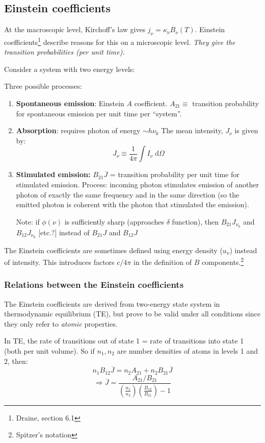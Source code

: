 \documentclass[11pt]{article}
\newcommand{\mar}[1]{\hspace{0pt}\marginpar{-\textcolor{black}{#1}-}}
\newcommand{\mynotes}[1]{{\fontfamily{cmss}\selectfont \textit{#1}}}
\begin{document}
\subsection{Einstein coefficients}
At the macroscopic level, Kirchoff's law gives $ j_{\nu} = \kappa_{\nu}
B_{\nu}(T) $. Einstein coefficients\footnote{Draine, section 6.1} describe
reasons for this on a microscopic level.
\mynotes{They give the transition \emph{probabilities} (per unit time).}

Consider a system with two energy levels:

Three possible processes:
\begin{enumerate}[itemsep=1ex, parsep=1ex]
    \item \textbf{Spontaneous emission}: Einstein $A$ coefficient.
        $A_{21} \equiv$ transition probability for spontaneous emission
        per unit time per ``system''.
    \item \textbf{Absorption}: requires photon of energy $\sim h\nu_{0}$
        The mean intensity, $J_{\nu}$ is given by:
        \[
            J_{\nu} \equiv \frac{1}{4\pi} \int{ I_{\nu} \;\mathrm{d}\Omega }
            \]
    \item \mar{29}\textbf{Stimulated emission:}
        $ B_{21} \overline{J} $ = transition probability per unit
        time for stimulated emission. Process: incoming photon stimulates
        emission of another photon of exactly the same frequency and in
        the same direction (so the emitted photon is coherent with the
        photon that stimulated the emission).

        Note: if $\phi(\nu)$ is sufficiently sharp (approaches $\delta$
        function), then
        $B_{21}J_{\nu_{0}}$ and $B_{12}J_{\nu_{0}}$ [etc.?]
        instead of $B_{21}J$ and $B_{12}J$
\end{enumerate}
The Einstein coefficients are sometimes defined using energy density
($u_{\nu}$) instead of intensity. This introduces factors $c/4\pi$
in the definition of $B$ components.\footnote{Spitzer's notation}

\subsubsection{Relations between the Einstein coefficients}
The Einstein coefficients are derived from two-energy state system in
thermodynamic equilibrium (TE), but prove to be
valid under all conditions since they only refer to \emph{atomic} properties.

In TE, the rate of transitions out of state 1 = rate of transitions into state
1 (both per unit volume). So if $n_{1}, n_{2}$ are number densities of atoms
in levels 1 and 2, then:
\[
    n_{1} B_{12} \overline{J}
    = n_{2} A_{21} + n_{2} B_{21} \overline{J}
    \]
\[
    \Longrightarrow \overline{J} = \frac{A_{21}/B_{21}} {
        \left( \frac{n_{1}}{n_{2}} \right)
        \left( \frac{B_{12}}{B_{21}} \right) - 1 }
    \]
\end{document}
